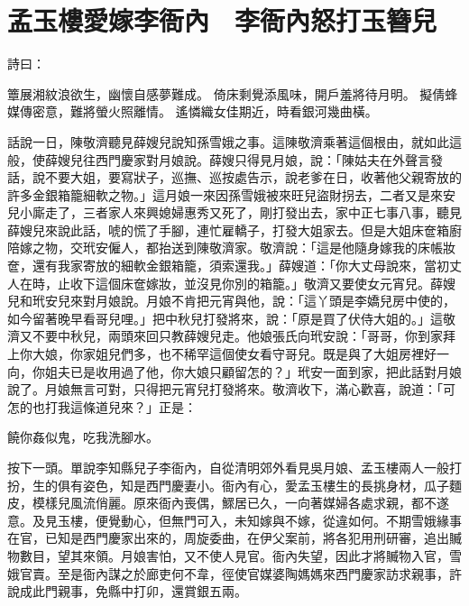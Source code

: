 %

\chapter{孟玉樓愛嫁李衙內　李衙內怒打玉簪兒}

\begin{showcontents}{}


詩曰：

簟展湘紋浪欲生，幽懷自感夢難成。
倚床剩覺添風味，開戶羞將待月明。
擬倩蜂媒傳密意，難將螢火照離情。
遙憐織女佳期近，時看銀河幾曲橫。

話說一日，陳敬濟聽見薛嫂兒說知孫雪娥之事。這陳敬濟乘著這個根由，就如此這般，使薛嫂兒往西門慶家對月娘說。薛嫂只得見月娘，說：「陳姑夫在外聲言發話，說不要大姐，要寫狀子，巡撫、巡按處告示，說老爹在日，收著他父親寄放的許多金銀箱籠細軟之物。」這月娘一來因孫雪娥被來旺兒盜財拐去，二者又是來安兒小廝走了，三者家人來興媳婦惠秀又死了，剛打發出去，家中正七事八事，聽見薛嫂兒來說此話，唬的慌了手腳，連忙雇轎子，打發大姐家去。但是大姐床奩箱廚陪嫁之物，交玳安僱人，都抬送到陳敬濟家。敬濟說：「這是他隨身嫁我的床帳妝奩，還有我家寄放的細軟金銀箱籠，須索還我。」薛嫂道：「你大丈母說來，當初丈人在時，止收下這個床奩嫁妝，並沒見你別的箱籠。」敬濟又要使女元宵兒。薛嫂兒和玳安兒來對月娘說。月娘不肯把元宵與他，說：「這丫頭是李嬌兒房中使的，如今留著晚早看哥兒哩。」把中秋兒打發將來，說：「原是買了伏侍大姐的。」這敬濟又不要中秋兒，兩頭來回只教薛嫂兒走。他娘張氏向玳安說：「哥哥，你到家拜上你大娘，你家姐兒們多，也不稀罕這個使女看守哥兒。既是與了大姐房裡好一向，你姐夫已是收用過了他，你大娘只顧留怎的？」玳安一面到家，把此話對月娘說了。月娘無言可對，只得把元宵兒打發將來。敬濟收下，滿心歡喜，說道：「可怎的也打我這條道兒來？」正是：

饒你姦似鬼，吃我洗腳水。

按下一頭。單說李知縣兒子李衙內，自從清明郊外看見吳月娘、孟玉樓兩人一般打扮，生的俱有姿色，知是西門慶妻小。衙內有心，愛孟玉樓生的長挑身材，瓜子麵皮，模樣兒風流俏麗。原來衙內喪偶，鰥居已久，一向著媒婦各處求親，都不遂意。及見玉樓，便覺動心，但無門可入，未知嫁與不嫁，從違如何。不期雪娥緣事在官，已知是西門慶家出來的，周旋委曲，在伊父案前，將各犯用刑研審，追出贓物數目，望其來領。月娘害怕，又不使人見官。衙內失望，因此才將贓物入官，雪娥官賣。至是衙內謀之於廊吏何不韋，徑使官媒婆陶媽媽來西門慶家訪求親事，許說成此門親事，免縣中打卯，還賞銀五兩。


\end{showcontents}
